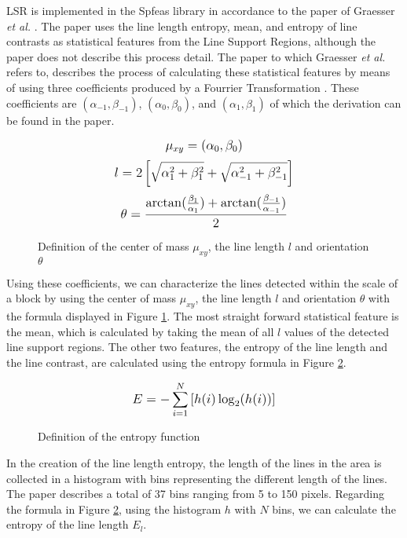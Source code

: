LSR is implemented in the Spfeas library in accordance to the paper of Graesser \textit{et al.} \cite{graesser2012image}. The paper uses the line length entropy, mean, and entropy of line contrasts as statistical features from the Line Support Regions, although the paper does not describe this process detail. The paper to which Graesser \textit{et al.} refers to, describes the process of calculating these statistical features by means of using three coefficients produced by a Fourrier Transformation \cite{unsalan2004classifying}. These coefficients are $(\alpha_{-1}, \beta_{-1})$, $(\alpha_{0}, \beta_{0})$, and $(\alpha_{1}, \beta_{1})$ of which the derivation can be found in the paper.

\begin{figure}[h]
	\centering
	$$\mathlarger{\mu_{xy} = (\alpha_{0}, \beta_{0})}$$
	$$\mathlarger{l = 2\left[\sqrt{\alpha_{1}^2 + \beta_{1}^2} + \sqrt{\alpha_{-1}^2 + \beta_{-1}^2}\right]}$$
	$$\mathlarger{\theta = \frac{\arctan(\frac{\beta_{1}}{\alpha_{1}}) + \arctan(\frac{\beta_{-1}}{\alpha_{-1}})}{2}}$$
	\caption{Definition of the center of mass $\mu_{xy}$, the line length $l$ and orientation $\theta$}
	\label{line_def}
\end{figure}

Using these coefficients, we can characterize the lines detected within the scale of a block by using the center of mass $\mu_{xy}$, the line length $l$ and orientation $\theta$ with the formula displayed in Figure \ref{line_def}. The most straight forward statistical feature is the mean, which is calculated by taking the mean of all $l$ values of the detected line support regions. The other two features, the entropy of the line length and the line contrast,  are calculated using the entropy formula in Figure \ref{line_entropy_def}. 

\begin{figure}[h]
	
	$$ \mathlarger{E = -\sum_{i=1}^{N} \left[ h(i) \log_2(h(i))\right]}$$
	\caption{Definition of the entropy function}
	\label{line_entropy_def}
\end{figure}

In the creation of the line length entropy, the length of the lines in the area is collected in a histogram with bins representing the different length of the lines. The paper\cite{unsalan2004classifying} describes a total of 37 bins ranging from 5 to 150 pixels. Regarding the formula in Figure \ref{line_entropy_def}, using the histogram $h$ with $N$ bins, we can calculate the entropy of the line length $E_l$.

